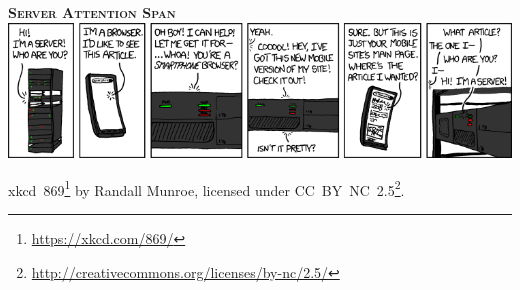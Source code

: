 \newpage
\thispagestyle{empty}

\mbox{}
\vfill
\begin{center}
\textbf{\textsc{Server Attention Span}}
\vskip 2mm
\includegraphics[width=1.0\textwidth]{components/server_attention_span.png}

\small xkcd~869\footnote{\url{https://xkcd.com/869/}} by Randall Munroe, licensed under CC~BY~NC~2.5\footnote{\url{http://creativecommons.org/licenses/by-nc/2.5/}}.
\end{center}
\vfill
\mbox{}
